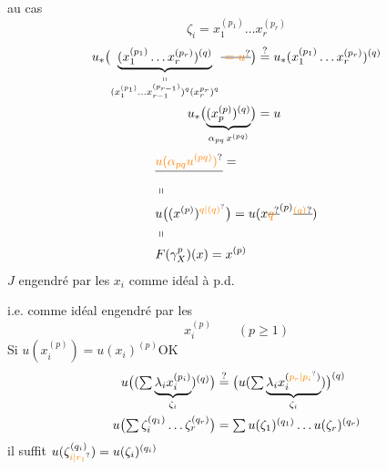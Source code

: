   au cas
\[
\zeta_i=x_1^{(p_1)}\ldots x_r^{(p_r)}
\]
\[
\begin{aligned}
u_*\bigl(\underbrace{(x_1^{(p_1)}\ldots x_r^{(p_r)})^{(q)}}_{\substack{\shortparallel\\(x_1^{(p_1)}\ldots x_{r-1}^{(p_{r-1})})^q(x_r^{p_r})^q}}\deleted{\unsure{{}=u}}\bigr)
&\overset{?}{=}u_*(x_1^{(p_1)}\ldots x_r^{(p_r)})^{(q)}\\
u_*\bigl(\underbrace{(x_{p}^{(p)})^{(q)}}_{\alpha_{pq}\,x^{(pq)}}\bigr)&=u
\end{aligned}
\]
\[
\begin{aligned}
&\deleted{\unsure{u(\alpha_{pq}u^{(pq)})}}={}\\
&\shortparallel\\
&u\bigl((x^{(p)})^{\unsure{q|(q)}}\bigr)=u(x\deleted{\unsure{q}}^{(p)}\deleted{\unsure{^{(q)}}})\\
&\shortparallel\\
&F(\gamma_X^p)(x)=x^{(p)}
\end{aligned}
\]
$J$ engendré par les $x_i$ comme idéal à p.d.

i.e. comme idéal engendré par les
\[
x_i^{(p)}\qquad(p\geqslant1)
\]
Si $u(x_i^{(p)})=u(x_i)^{(p)}$\qquad OK
\[
\begin{aligned}
u\bigl((\textstyle\sum\underbrace{\lambda_i x_i^{(p_i)}}_{\zeta_i})^{(q)}\bigr)
&\overset{?}{=}\bigl(u(\textstyle\sum\underbrace{\lambda_i x_i^{(\unsure{p_r|p_i})}}_{\zeta_i})\bigr)^{(q)}\\
u\bigl(\textstyle\sum\zeta_i^{(q_1)}\ldots\zeta_r^{(q_r)}\bigr)
&=\textstyle\sum u(\zeta_1)^{(q_1)}\ldots u(\zeta_r)^{(q_r)}
\end{aligned}
\]
il suffit $u(\zeta_{\unsure{i|r_1}}^{(q_i)})=u(\zeta_i)^{(q_i)}$

